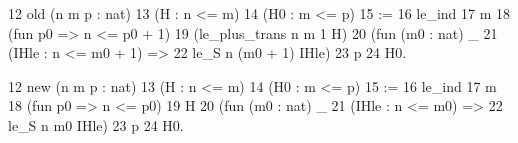 12  old (n m p : nat)
13    (H : n <= m) 
14    (H0 : m <= p)
15  :=
16    le_ind
17      m
18      (fun p0 => n <= p0 + 1)
19      (le_plus_trans n m 1 H)
20      (fun (m0 : nat) _
21        (IHle : n <= m0 + 1) =>
22          le_S n (m0 + 1) IHle)
23      p
24      H0.

12  new (n m p : nat)
13    (H : n <= m) 
14    (H0 : m <= p)
15  :=
16    le_ind
17      m
18      (fun p0 => n <= p0)
19      H
20      (fun (m0 : nat) _ 
21        (IHle : n <= m0) =>
22          le_S n m0 IHle)
23      p
24      H0.
